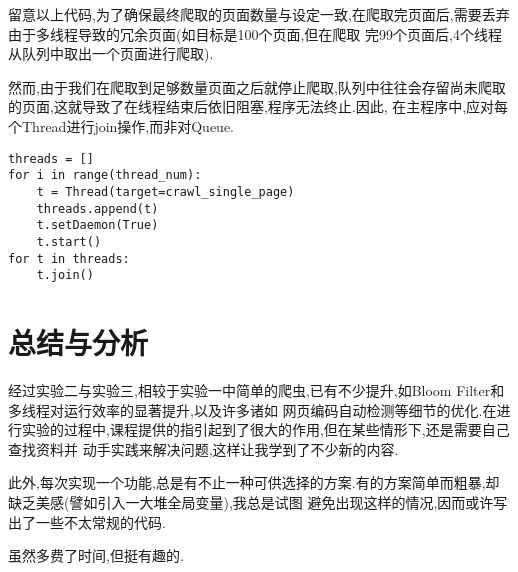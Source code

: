 \documentclass[a4paper]{article}
\begin{document}
留意以上代码,为了确保最终爬取的页面数量与设定一致,在爬取完页面后,需要丢弃由于多线程导致的冗余页面(如目标是100个页面,但在爬取
完99个页面后,4个线程从队列中取出一个页面进行爬取).

然而,由于我们在爬取到足够数量页面之后就停止爬取,队列中往往会存留尚未爬取的页面,这就导致了在线程结束后依旧阻塞,程序无法终止.因此,
在主程序中,应对每个Thread进行join操作,而非对Queue.
\begin{verbatim}
threads = []
for i in range(thread_num):
    t = Thread(target=crawl_single_page)
    threads.append(t)
    t.setDaemon(True)
    t.start()
for t in threads:
    t.join()
\end{verbatim}
    \newpage
    \section{总结与分析}
经过实验二与实验三,相较于实验一中简单的爬虫,已有不少提升,如Bloom Filter和多线程对运行效率的显著提升,以及许多诸如
网页编码自动检测等细节的优化.在进行实验的过程中,课程提供的指引起到了很大的作用,但在某些情形下,还是需要自己查找资料并
动手实践来解决问题,这样让我学到了不少新的内容.

此外,每次实现一个功能,总是有不止一种可供选择的方案.有的方案简单而粗暴,却缺乏美感(譬如引入一大堆全局变量),我总是试图
避免出现这样的情况,因而或许写出了一些不太常规的代码.

虽然多费了时间,但挺有趣的.
\end{document}
